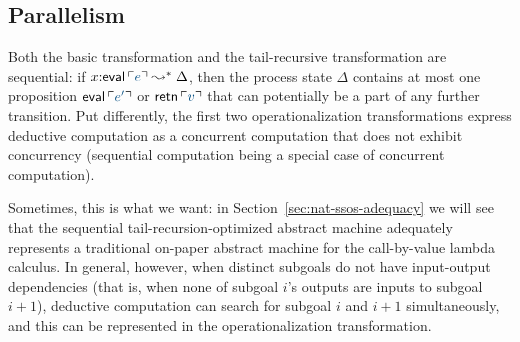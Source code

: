 
\subsection{Parallelism}
\label{sec:trans-par}

Both the basic transformation and the tail-recursive transformation
are sequential: if $x{:}{\sf eval}\,\interp{e} \leadsto^* \Delta$,
then the process state $\Delta$ contains at most one proposition ${\sf
  eval}\,\interp{e'}$ or ${\sf retn}\,\interp{v}$ that can potentially
be a part of any further transition. Put differently, the first two
operationalization transformations express deductive computation as a
concurrent computation that does not exhibit concurrency (sequential
computation being a special case of concurrent computation).

Sometimes, this is what we want: in
Section~\ref{sec:nat-ssos-adequacy} we will see that the sequential
tail-recursion-optimized abstract machine 
adequately represents a traditional on-paper abstract machine for
the call-by-value lambda calculus. In general, however, when distinct
subgoals do not have input-output dependencies (that is, when none of
subgoal $i$'s outputs are inputs to subgoal $i+1$), deductive computation
can search for subgoal $i$ and $i+1$ simultaneously, and this can 
be represented in the operationalization transformation.

